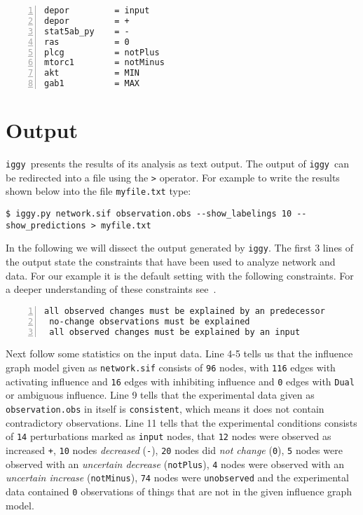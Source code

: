 \documentclass{article}
\newcommand\iggy{\texttt{iggy}}
\begin{document}
\begin{Verbatim}[frame=single,numbers=left]
depor         = input 
depor         = +
stat5ab_py    = -
ras           = 0
plcg          = notPlus
mtorc1        = notMinus
akt           = MIN
gab1          = MAX
\end{Verbatim}  


\section{Output}

\iggy\ presents the results of its analysis as text output. 
The output of \iggy\ can be redirected into a file using the \texttt{>} operator.
For example to write the results shown below into the file \texttt{myfile.txt} type:

\begin{Verbatim}[frame=single]
$ iggy.py network.sif observation.obs --show_labelings 10 --show_predictions > myfile.txt
\end{Verbatim}

In the following we will dissect the output generated by \iggy.
The first 3 lines of the output state the constraints that have been used to analyze network and data.
For our example it is the default setting with the following constraints.
For a deeper understanding of these constraints see~\cite{sthiele15}.

\begin{Verbatim}[frame=single,numbers=left]
 all observed changes must be explained by an predecessor
 no-change observations must be explained
 all observed changes must be explained by an input
\end{Verbatim}

Next follow some statistics on the input data. 
Line 4-5 tells us that the influence graph model given as \texttt{network.sif} 
consists of \texttt{96} nodes, 
with \texttt{116} edges with activating influence 
and \texttt{16} edges with inhibiting influence
and \texttt{0} edges with \texttt{Dual} or ambiguous influence.
%
Line 9 tells that the experimental data given as \texttt{observation.obs} in itself is \texttt{consistent},
which means it does not contain contradictory observations.
Line 11 tells that the experimental conditions consists of \texttt{14} perturbations marked as \texttt{input} nodes, 
that \texttt{12} nodes were observed as increased \texttt{+}, 
\texttt{10} nodes \emph{decreased} (\texttt{-}),
\texttt{20} nodes did \emph{not change} (\texttt{0}),
\texttt{5} nodes were observed with an \emph{uncertain decrease} (\texttt{notPlus}),
\texttt{4} nodes were observed with an \emph{uncertain increase} (\texttt{notMinus}),
\texttt{74} nodes were \texttt{unobserved} and the experimental data contained \texttt{0} observations of things that are not in the given influence graph model.
\end{document}
